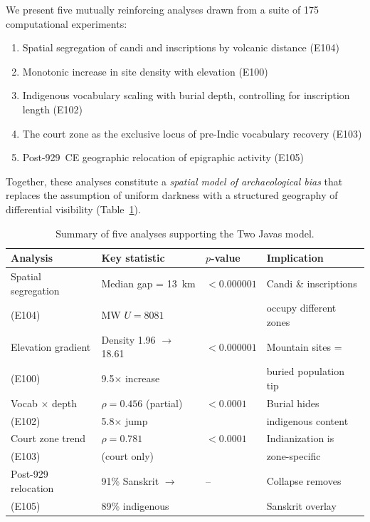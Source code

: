 \documentclass[12pt]{article}
\begin{document}
We present five mutually reinforcing analyses drawn from a suite of 175 computational experiments:
\begin{enumerate}
    \item Spatial segregation of candi and inscriptions by volcanic distance (E104)
    \item Monotonic increase in site density with elevation (E100)
    \item Indigenous vocabulary scaling with burial depth, controlling for inscription length (E102)
    \item The court zone as the exclusive locus of pre-Indic vocabulary recovery (E103)
    \item Post-929~CE geographic relocation of epigraphic activity (E105)
\end{enumerate}

Together, these analyses constitute a \emph{spatial model of archaeological bias} that replaces the assumption of uniform darkness with a structured geography of differential visibility (Table~\ref{tab:summary}).

\begin{table}[htbp]
\centering
\caption{Summary of five analyses supporting the Two Javas model.}
\label{tab:summary}
\begin{tabular}{llll}
\toprule
\textbf{Analysis} & \textbf{Key statistic} & \textbf{$p$-value} & \textbf{Implication} \\
\midrule
Spatial segregation & Median gap = 13~km & $< 0.000001$ & Candi \& inscriptions \\
(E104) & MW $U = 8081$ & & occupy different zones \\
\addlinespace
Elevation gradient & Density 1.96 $\rightarrow$ 18.61 & $< 0.000001$ & Mountain sites = \\
(E100) & 9.5$\times$ increase & & buried population tip \\
\addlinespace
Vocab $\times$ depth & $\rho = 0.456$ (partial) & $< 0.0001$ & Burial hides \\
(E102) & 5.8$\times$ jump & & indigenous content \\
\addlinespace
Court zone trend & $\rho = 0.781$ & $< 0.0001$ & Indianization is \\
(E103) & (court only) & & zone-specific \\
\addlinespace
Post-929 relocation & 91\% Sanskrit $\rightarrow$ & -- & Collapse removes \\
(E105) & 89\% indigenous & & Sanskrit overlay \\
\bottomrule
\end{tabular}
\end{table}
\end{document}
